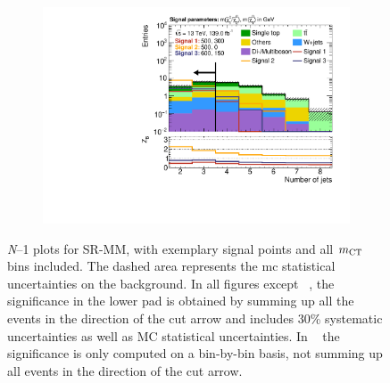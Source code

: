 \begin{figure}
	\begin{subfigure}[b]{0.45\linewidth}
		\centering\includegraphics[width=\textwidth]{n1_SRMM_mct_bins/nJet30.pdf}
		\vspace{-2em}
		\caption{\label{fig:Wh_reopt_second_round_n1_srmm_njet}}
	\end{subfigure}
	\caption{\textit{N}--1 plots for SR-MM, with exemplary signal points and all $m_{\textrm{CT}}$ bins included. The dashed area represents the \gls{mc} statistical uncertainties on the background. In all figures except \figname~, the significance in the lower pad is obtained by summing up all the events in the direction of the cut arrow and includes 30\% systematic uncertainties as well as MC statistical uncertainties. In \figname~ the significance is only computed on a bin-by-bin basis, \ie not summing up all events in the direction of the cut arrow.}
	\label{fig:Wh_reopt_second_round_n1_srmm}
\end{figure}

